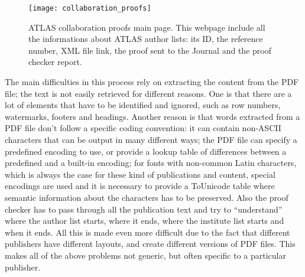 \begin{figure}[htb]
  \centering
  \texttt{[image: collaboration\_proofs]}
  \caption{ATLAS collaboration proofs main page. This webpage include all the informations about ATLAS author lists: its ID, the reference number, XML file link, the proof sent to the Journal and the proof checker report.}
  \label{fig:collaboration_proofs}
\end{figure}

The main difficulties in this process rely on extracting the content from the PDF file; the text is not easily retrieved for different reasons.
One is that there are a lot of elements that have to be identified and ignored, such as row numbers, watermarks, footers and headings.
Another reason is that words extracted from a PDF file don't follow a specific coding convention:
it can contain non-ASCII characters that can be output in many different ways;
the PDF file can specify a predefined encoding to use, or provide a lookup table of differences between a predefined and a built-in encoding;
for fonts with non-common Latin characters, which is always the case for these kind of publications and content,
special encodings are used and it is necessary to provide a ToUnicode table where semantic information about the characters has to be preserved.
Also the proof checker has to pass through all the publication text and try to \enquote{understand} where the author list starts, where it ends, where the institute list starts and when it ends.
All this is made even more difficult due to the fact that different publishers have different layouts, and create different versions of PDF files.
This makes all of the above problems not generic,
but often specific to a particular publisher.

